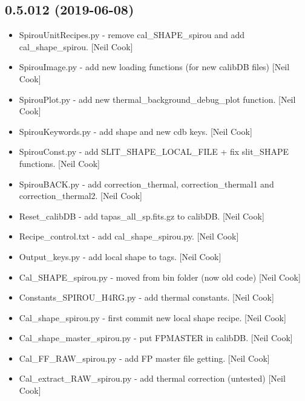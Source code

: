 \documentclass[a4paper,10pt,english]{report}
\begin{document}
\subsection{0.5.012 (2019-06-08)}
\label{\detokenize{misc/changelog:id123}}\begin{itemize}
\item {} 
SpirouUnitRecipes.py - remove cal\_SHAPE\_spirou and add
cal\_shape\_spirou. {[}Neil Cook{]}

\item {} 
SpirouImage.py - add new loading functions (for new calibDB files)
{[}Neil Cook{]}

\item {} 
SpirouPlot.py - add new thermal\_background\_debug\_plot function. {[}Neil
Cook{]}

\item {} 
SpirouKeywords.py - add shape and new cdb keys. {[}Neil Cook{]}

\item {} 
SpirouConst.py - add SLIT\_SHAPE\_LOCAL\_FILE + fix slit\_SHAPE functions.
{[}Neil Cook{]}

\item {} 
SpirouBACK.py - add correction\_thermal, correction\_thermal1 and
correction\_thermal2. {[}Neil Cook{]}

\item {} 
Reset\_calibDB - add tapas\_all\_sp.fits.gz to calibDB. {[}Neil Cook{]}

\item {} 
Recipe\_control.txt - add cal\_shape\_spirou.py. {[}Neil Cook{]}

\item {} 
Output\_keys.py - add local shape to tags. {[}Neil Cook{]}

\item {} 
Cal\_SHAPE\_spirou.py - moved from bin folder (now old code) {[}Neil Cook{]}

\item {} 
Constants\_SPIROU\_H4RG.py - add thermal constants. {[}Neil Cook{]}

\item {} 
Cal\_shape\_spirou.py - first commit new local shape recipe. {[}Neil Cook{]}

\item {} 
Cal\_shape\_master\_spirou.py - put FPMASTER in calibDB. {[}Neil Cook{]}

\item {} 
Cal\_FF\_RAW\_spirou.py - add FP master file getting. {[}Neil Cook{]}

\item {} 
Cal\_extract\_RAW\_spirou.py - add thermal correction (untested) {[}Neil
Cook{]}

\end{itemize}
\end{document}
